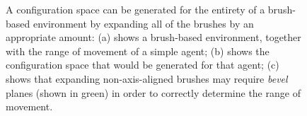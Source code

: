 \documentclass[10pt,twocolumn]{article}
\newenvironment{stusubfig}[1]
{
	\begin{figure}[#1]
	\begin{center}
}
{
	\end{center}
	\end{figure}
}
\begin{document}
\begin{stusubfig}{!t}
	\hspace{4mm}%
	\hspace{4mm}%
\caption{A configuration space can be generated for the entirety of a brush-based environment by expanding all of the brushes by an appropriate amount: (a) shows a brush-based environment, together with the range of movement of a simple agent; (b) shows the configuration space that would be generated for that agent; (c) shows that expanding non-axis-aligned brushes may require \emph{bevel} planes (shown in green) in order to correctly determine the range of movement.}
\label{fig:configspace}
\end{stusubfig}
\end{document}
